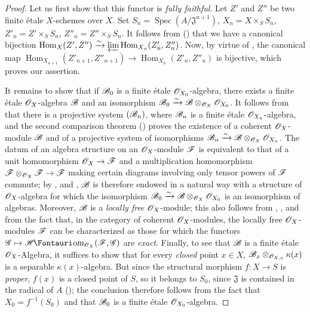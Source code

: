 \begin{proof}
Let us first show that this functor is \emph{fully faithful}.
Let $Z'$ and $Z''$ be two finite \'etale $X$-schemes over $X$.
Set $S_n=\operatorname{Spec}(A/\mathfrak{J}^{n+1})$, $X_n=X\times_S S_n$, $Z'_n=Z'\times_S S_n$, $Z''_n=Z''\times_S S_n$.
It follows from () that we have a canonical bijection $\operatorname{Hom}_X(Z',Z'')\xrightarrow{\sim}\varprojlim\operatorname{Hom}_{X_n}(Z'_n,Z''_n)$.
Now, by virtue of , the canonical map $\operatorname{Hom}_{X_{n+1}}(Z'_{n+1},Z''_{n+1})\to\operatorname{Hom}_{X_n}(Z'_n,Z''_n)$ is bijective, which proves our assertion.

It remains to show that if $\mathscr{B}_0$ is a finite \'etale $\mathscr{O}_{X_0}$-algebra, there exists a finite \'etale $\mathscr{O}_X$-algebra $\mathscr{B}$ and an isomorphism $\mathscr{B}_0\xrightarrow{\sim}\mathscr{B}\otimes_{\mathscr{O}_X}\mathscr{O}_{X_0}$.
It follows from  that there is a projective system $(\mathscr{B}_n)$, where $\mathscr{B}_n$ is a finite \'etale $\mathscr{O}_{X_n}$-algebra, and the second comparison theorem () proves the existence of a coherent $\mathscr{O}_X$-module $\mathscr{B}$ and of a projective system of isomorphisms $\mathscr{B}_n\xrightarrow{\sim}\mathscr{B}\otimes_{\mathscr{O}_X}\mathscr{O}_{X_n}$.
The datum of an algebra structure on an $\mathscr{O}_X$-module $\mathscr{F}$ is equivalent to that of a unit homomorphism $\mathscr{O}_X\to\mathscr{F}$ and a multiplication homomorphism $\mathscr{F}\otimes_{\mathscr{O}_X}\mathscr{F}\to\mathscr{F}$ making certain diagrams involving only tensor powers of $\mathscr{F}$ commute;
by ,  and , $\mathscr{B}$ is therefore endowed in a natural way with a structure of $\mathscr{O}_X$-algebra for which the isomorphism $\mathscr{B}_0\xrightarrow{\sim}\mathscr{B}\otimes_{\mathscr{O}_X}\mathscr{O}_{X_0}$ is an isomorphism of algebras.
Moreover, $\mathscr{B}$ is a \emph{locally free} $\mathscr{O}_X$-module;
this also follows from , ,  and from the fact that, in the category of coherent $\mathscr{O}_X$-modules, the locally free $\mathscr{O}_X$-modules $\mathscr{F}$ can be characterized as those for which the functors $\sh{G}\mapsto\shHom_{\sh{O}_X}(\sh{F},\sh{G})$ are \emph{exact}.
Finally, to see that $\mathscr{B}$ is a finite \'etale $\mathscr{O}_X$-Algebra, it suffices  to show that for every \emph{closed} point $x\in X$, $\mathscr{B}_x\otimes_{\mathscr{O}_{X,x}}\kappa(x)$ is a separable $\kappa(x)$-algebra.
But since the structural morphism $f:X\to S$ is \emph{proper}, $f(x)$ is a closed point of $S$, so it belongs to $S_0$, since $\mathfrak{J}$ is contained in the radical of $A$ ();
the conclusion therefore follows from the fact that $X_0=f^{-1}(S_0)$ and that $\mathscr{B}_0$ is a finite \'etale $\mathscr{O}_{X_0}$-algebra.
\end{proof}


